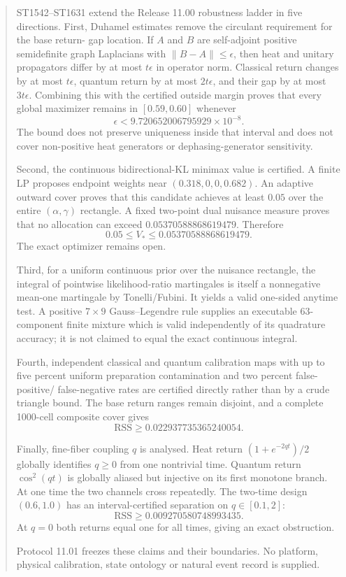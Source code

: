 \documentclass[11pt,a4paper]{article}
\begin{document}
\begin{abstract}
ST1542--ST1631 extend the Release 11.00 robustness ladder in five directions.
First, Duhamel estimates remove the circulant requirement for the base return-
gap location.  If $A$ and $B$ are self-adjoint positive semidefinite graph
Laplacians with $\|B-A\|\le\epsilon$, then heat and unitary propagators differ
by at most $t\epsilon$ in operator norm.  Classical return changes by at most
$t\epsilon$, quantum return by at most $2t\epsilon$, and their gap by at most
$3t\epsilon$.  Combining this with the certified outside margin proves that
every global maximizer remains in $[0.59,0.60]$ whenever
\[
\epsilon<9.720652006795929\times10^{-8}.
\]
The bound does not preserve uniqueness inside that interval and does not cover
non-positive heat generators or dephasing-generator sensitivity.

Second, the continuous bidirectional-KL minimax value is certified.  A finite
LP proposes endpoint weights near $(0.318,0,0,0.682)$.  An adaptive outward
cover proves that this candidate achieves at least $0.05$ over the entire
$(\alpha,\gamma)$ rectangle.  A fixed two-point dual nuisance measure proves
that no allocation can exceed $0.05370588868619479$.  Therefore
\[
0.05\le V_*\le0.05370588868619479.
\]
The exact optimizer remains open.

Third, for a uniform continuous prior over the nuisance rectangle, the integral
of pointwise likelihood-ratio martingales is itself a nonnegative mean-one
martingale by Tonelli/Fubini.  It yields a valid one-sided anytime test.  A
positive $7\times9$ Gauss--Legendre rule supplies an executable 63-component
finite mixture which is valid independently of its quadrature accuracy; it is
not claimed to equal the exact continuous integral.

Fourth, independent classical and quantum calibration maps with up to five
percent uniform preparation contamination and two percent false-positive/
false-negative rates are certified directly rather than by a crude triangle
bound.  The base return ranges remain disjoint, and a complete 1000-cell
composite cover gives
\[
\mathrm{RSS}\ge0.022937735365240054.
\]

Finally, fine-fiber coupling $q$ is analysed.  Heat return
$(1+e^{-2qt})/2$ globally identifies $q\ge0$ from one nontrivial time.  Quantum
return $\cos^2(qt)$ is globally aliased but injective on its first monotone
branch.  At one time the two channels cross repeatedly.  The two-time design
$(0.6,1.0)$ has an interval-certified separation on $q\in[0.1,2]$:
\[
\mathrm{RSS}\ge0.009270580748993435.
\]
At $q=0$ both returns equal one for all times, giving an exact obstruction.

Protocol 11.01 freezes these claims and their boundaries.  No platform,
physical calibration, state ontology or natural event record is supplied.
\end{abstract}
\end{document}
